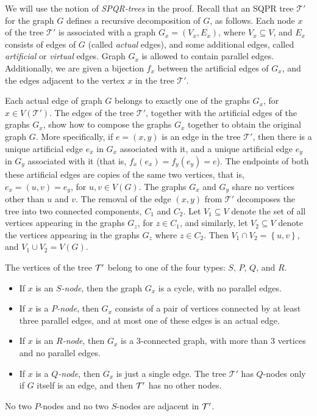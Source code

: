 \documentclass[twoside,leqno,twocolumn]{article}
\newcommand{\set}[1]{\left\{ #1 \right\}}
\newcommand{\sse}{\subseteq}
\newcommand{\tset}{{\mathcal T}}
\begin{document}
\iffull



We will use the notion of \textit{SPQR-trees} in the proof. 
Recall that an SQPR tree $\tset'$ for the graph $G$ defines a recursive decomposition
of $G$, as follows. Each node $x$ of the tree $\tset'$ is associated with a graph $G_x=(V_x,E_x)$, where $V_x\sse V$, and $E_x$ consists of edges of $G$ (called  \textit{actual} edges), and some additional edges, called \textit{artificial} or \textit{virtual} edges.
Graph $G_x$ is allowed to contain parallel edges. Additionally, we are given a bijection $f_x$ between the artificial edges of $G_x$, and the edges adjacent to the vertex $x$ in the tree $\tset'$.

Each actual edge of graph $G$ belongs to exactly one of the graphs $G_x$, for $x\in V(\tset')$. The edges of the tree $\tset'$, together with the artificial edges of the graphs $G_x$, show how to compose the graphs $G_x$ together to obtain the original graph $G$. More specifically, if $e=(x,y)$ is an edge in the tree $\tset'$, then there is a unique artificial edge $e_x$ in $G_x$ associated with it, and a unique artificial edge $e_y$ in $G_y$ associated with it (that is, $f_x(e_x)=f_y(e_y)=e$). The endpoints of both these artificial edges are copies of the same two vertices, that is, $e_x=(u,v)=e_y$, for $u,v\in V(G)$. 
The graphs $G_x$ and $G_y$ share no vertices other than $u$ and $v$.
The removal of the edge $(x,y)$ from $\tset'$ decomposes the tree into two connected components, $C_1$ and $C_2$. Let $V_1\sse V$ denote the set of all vertices appearing in the graphs $G_z$, for $z\in C_1$, and similarly, let $V_2\sse V$ denote the vertices appearing in the graphs $G_z$ where $z\in C_2$. Then $V_1\cap V_2=\set{u,v}$, and $V_1\cup V_2=V(G)$. 

The vertices of the tree $\cal T'$ belong to one of the four types: $S$, $P$, $Q$, and $R$.
\begin{itemize}
\item If $x$ is an \emph{$S$-node}, then the graph $G_x$ is a cycle, with no parallel edges.
\item If $x$ is a \emph{$P$-node}, then $G_x$ consists of a pair of vertices connected by at least 
three parallel edges, and at most one of these edges is an actual edge.
\item If $x$ is an \emph{$R$-node}, then $G_x$ is a 3-connected graph, with more than 3 vertices and
no parallel edges.
\item If $x$ is a \emph{$Q$-node}, then $G_x$ is just a single edge. The tree $\tset'$ has
$Q$-nodes only if $G$ itself is an edge, and then $\cal T'$ has no other nodes.
\end{itemize}
No two $P$-nodes and no two $S$-nodes are adjacent in ${\cal T'}$.
\end{document}
